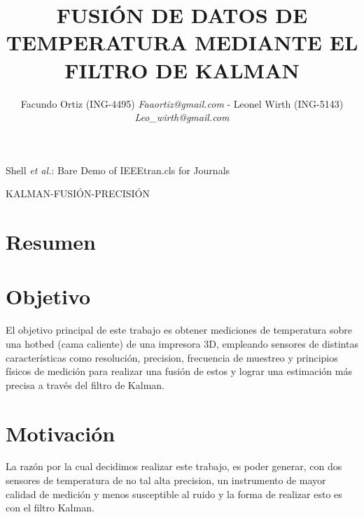 \documentclass[journal]{IEEEtran}
\begin{document}
\title{FUSIÓN DE DATOS DE TEMPERATURA MEDIANTE EL FILTRO DE KALMAN}


\author{Facundo Ortiz (ING-4495) \textit{Faaortiz@gmail.com} - Leonel Wirth (ING-5143)  \textit{Leo\_wirth@gmail.com}}%



%
{Shell \MakeLowercase{\textit{et al.}}: Bare Demo of IEEEtran.cls for Journals}




\maketitle


\begin{IEEEkeywords}
KALMAN-FUSIÓN-PRECISIÓN
\end{IEEEkeywords}

\IEEEpeerreviewmaketitle

\section{Resumen}


\section{Objetivo}
El objetivo principal de este trabajo es obtener mediciones de temperatura sobre una hotbed (cama caliente) 
de una impresora 3D, empleando sensores de distintas características como resolución, precision, frecuencia 
de muestreo y principios físicos de medición para realizar una fusión de estos y lograr una estimación más 
precisa a través del filtro de Kalman.


\section{Motivación}
La razón por la cual decidimos
realizar este trabajo, es poder generar, con dos sensores
de temperatura de no tal alta precision, un instrumento de mayor
calidad de medición y menos susceptible al ruido y la forma
de realizar esto es con el filtro Kalman.
\end{document}
